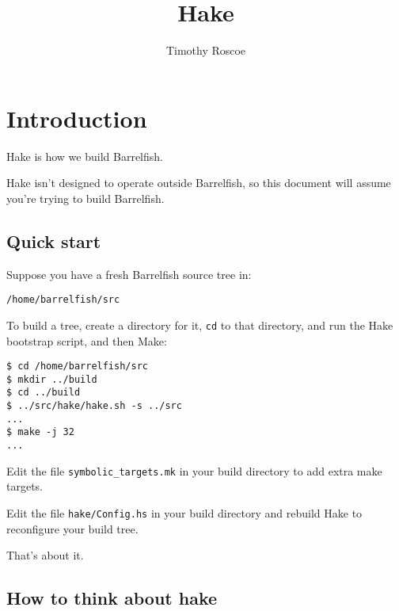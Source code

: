 \documentclass[a4paper,twoside]{report} %
\title{Hake}   %
\author{Timothy Roscoe}	%
\begin{document}
\maketitle

%
%
\begin{versionhistory}
\end{versionhistory}

\tableofcontents		%

\chapter{Introduction}

Hake is how we build Barrelfish. 

Hake isn't designed to operate outside Barrelfish, so this document
will assume you're trying to build Barrelfish. 

\section{Quick start}

Suppose you have a fresh Barrelfish source tree in:

\texttt{/home/barrelfish/src}

To build a tree, create a directory for it, \texttt{cd} to that
directory, and run the Hake bootstrap script, and then Make:

\begin{verbatim}
$ cd /home/barrelfish/src
$ mkdir ../build
$ cd ../build
$ ../src/hake/hake.sh -s ../src
...
$ make -j 32
...
\end{verbatim}

Edit the file \texttt{symbolic\_targets.mk} in your build directory to
add extra make targets. 

Edit the file \texttt{hake/Config.hs} in your build directory and
rebuild Hake to reconfigure your build tree. 

That's about it. 

\section{How to think about hake}
\end{document}
